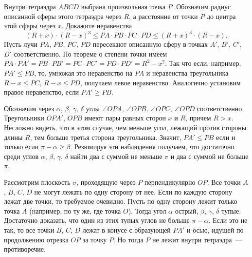 \problem
Внутри тетраэдра $ABCD$ выбрана произвольная точка $P$.
Обозначим радиус описанной сферы этого тетраэдра через $R$, а расстояние от
точки $P$ до центра этой сферы через $x$.
Докажите неравенства
\[
    (R + x) \cdot (R - x)^3
\leq
    PA \cdot PB \cdot PC \cdot PD
\leq
    (R + x)^3 \cdot (R - x)
.\]
\solution
Пусть лучи $PA$, $PB$, $PC$, $PD$ пересекают описанную сферу в точках
$A'$, $B'$, $C'$, $D'$ соответственно.
По теореме о степени точки имеем
$PA \cdot PA' = PB \cdot PB' = PC \cdot PC' = PD \cdot PD' = R^2 - x^2$.
Так что если, например, $PA' \leq PB$, то, умножая это неравенство на $PA$ и
неравенства треугольника $R - x \leq PC$, $R - x \leq PD$, получаем левое
неравенство.
Аналогично установим правое неравенство, если $PA' \geq PB$.
\par
Обозначим через $\alpha$, $\beta$, $\gamma$, $\delta$ углы
$\angle OPA$, $\angle OPB$, $\angle OPC$, $\angle OPD$ соответственно.
Треугольники $OPA'$, $OPB$ имеют пары равных сторон $x$ и $R$, причем $R > x$.
Несложно видеть, что в этом случае, чем меньше угол, лежащий против стороны
длины $R$, тем больше третья сторона треугольника.
Значит, $PA' \leq PB$ если и только если $\pi - \alpha \geq \beta$.
Резюмируя эти наблюдения получаем, что достаточно среди углов
$\alpha$, $\beta$, $\gamma$, $\delta$ найти два с суммой не меньше $\pi$ и
два с суммой не больше $\pi$.
\par
Рассмотрим плоскость $\sigma$, проходящую через $P$ перпендикулярно $OP$.
Все точки $A$, $B$, $C$, $D$ не могут лежать по одну сторону от нее.
Если по каждую сторону лежат две точки, то требуемое очевидно.
Пусть по одну сторону лежит только точка $A$
(например, по ту же, где точка $O$).
Тогда угол  $\alpha$ острый, $\beta$, $\gamma$, $\delta$ тупые.
Достаточно доказать, что один из этих тупых углов не больше $\pi - \alpha$.
Если это не так, то все точки $B$, $C$, $D$ лежат в конусе с образующей $PA'$ и осью, идущей по продолжению отрезка $OP$ за точку $P$.
Но тогда $P$ не лежит внутри тетраэдра~--- противоречие.
\endproblem
